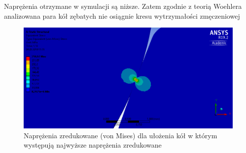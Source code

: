 Naprężenia otrzymane w symulacji są niższe.
Zatem zgodnie z teorią Woehlera analizowana para kół zębatych nie osiągnie kresu wytrzymałości zmęczeniowej


\begin{figure}[t]
	\centering
	\includegraphics[width=0.9\linewidth]{Obliczenia/von_mises_stress_przekladnia}
	\caption{Naprężenia zredukowane (von Mises) dla ułożenia kół w którym występują najwyższe naprężenia zredukowane} 
	\label{fig::geometria_plus_BC_przekladnia}
\end{figure}